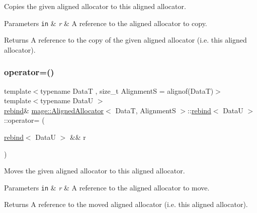 Copies the given aligned allocator to this aligned allocator. 
\begin{DoxyParams}[1]{Parameters}
\mbox{\tt in}  & {\em r} & A reference to the aligned allocator to copy. \\
\hline
\end{DoxyParams}
\begin{DoxyReturn}{Returns}
A reference to the copy of the given aligned allocator (i.\+e. this aligned allocator). 
\end{DoxyReturn}
\hypertarget{structmage_1_1_aligned_allocator_1_1rebind_a79fa8e41d87f7560eb74aaec7eecb191}{}\label{structmage_1_1_aligned_allocator_1_1rebind_a79fa8e41d87f7560eb74aaec7eecb191} 
\subsubsection{\texorpdfstring{operator=()}{operator=()}\hspace{0.1cm}{\footnotesize\ttfamily [2/2]}}
{\footnotesize\ttfamily template$<$typename DataT , size\+\_\+t AlignmentS = alignof(\+Data\+T)$>$ \\
template$<$typename DataU $>$ \\
\hyperlink{structmage_1_1_aligned_allocator_1_1rebind}{rebind}\& \hyperlink{classmage_1_1_aligned_allocator}{mage\+::\+Aligned\+Allocator}$<$ DataT, AlignmentS $>$\+::\hyperlink{structmage_1_1_aligned_allocator_1_1rebind}{rebind}$<$ DataU $>$\+::operator= (\begin{DoxyParamCaption}\item[{\hyperlink{structmage_1_1_aligned_allocator_1_1rebind}{rebind}$<$ DataU $>$ \&\&}]{r }\end{DoxyParamCaption})\hspace{0.3cm}{\ttfamily [delete]}}

Moves the given aligned allocator to this aligned allocator. 
\begin{DoxyParams}[1]{Parameters}
\mbox{\tt in}  & {\em r} & A reference to the aligned allocator to move. \\
\hline
\end{DoxyParams}
\begin{DoxyReturn}{Returns}
A reference to the moved aligned allocator (i.\+e. this aligned allocator). 
\end{DoxyReturn}
